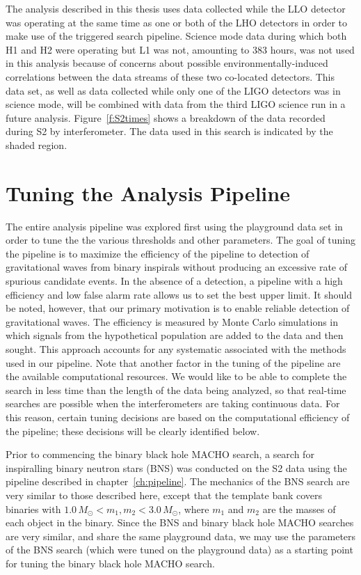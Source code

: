 The analysis described in this thesis uses data collected while the LLO
detector was operating at the same time as one or both of the LHO detectors in
order to make use of the triggered search pipeline.  Science mode data during
which both H1 and H2 were operating but L1 was not, amounting to 383 hours,
was not used in this analysis because of concerns about possible
environmentally-induced correlations between the data streams of these two
co-located detectors. This data set, as well as data collected while only one
of the LIGO detectors was in science mode, will be combined with data from the
third LIGO science run in a future analysis. Figure~\ref{f:S2times} shows a
breakdown of the data recorded during S2 by interferometer. The data used in
this search is indicated by the shaded region.

\section{Tuning the Analysis Pipeline}
\label{s:s2tuning}

The entire analysis pipeline was explored first using the playground data set
in order to tune the the various thresholds and other parameters. The goal of
tuning the pipeline is to maximize the efficiency of the pipeline to detection
of gravitational waves from binary inspirals without producing an excessive
rate of spurious candidate events. In the absence of a detection, a pipeline
with a high efficiency and low false alarm rate allows us to set the best
upper limit. It should be noted, however, that our primary motivation is to
enable reliable detection of gravitational waves. The efficiency is measured
by Monte Carlo simulations in which signals from the hypothetical population
are added to the data and then sought. This approach accounts for any
systematic associated with the methods used in our pipeline.  Note that
another factor in the tuning of the pipeline are the available computational
resources. We would like to be able to complete the search in less time than
the length of the data being analyzed, so that real-time searches are possible
when the interferometers are taking continuous data. For this reason, certain
tuning decisions are based on the computational efficiency of the pipeline;
these decisions will be clearly identified below.

Prior to commencing the binary black hole MACHO search, a search for
inspiralling binary neutron stars (BNS) was conducted on the S2 data using the
pipeline described in chapter~\ref{ch:pipeline}\cite{LIGOS2iul}. The mechanics
of the BNS search are very similar to those described here, except that the
template bank covers binaries with $1.0\,M_\odot < m_1, m_2 < 3.0\,M_\odot$,
where $m_1$ and $m_2$ are the masses of each object in the binary. Since the
BNS and binary black hole MACHO searches are very similar, and share the same
playground data, we may use the parameters of the BNS search (which were tuned
on the playground data) as a starting point for tuning the binary black hole
MACHO search. 

